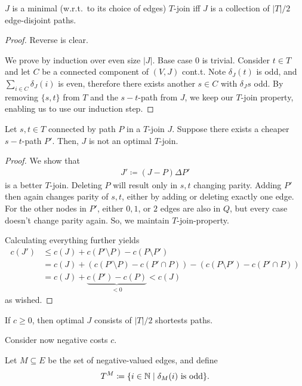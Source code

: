 \begin{theorem}
    $J$ is a minimal (w.r.t.\ to its choice of edges) $T$-join iff $J$ is a collection of $|T|/2$ edge-disjoint paths.
\end{theorem}
\begin{proof}
    Reverse is clear.

    We prove by induction over even size $|J|$. Base case $0$ is trivial.
    Consider $t \in T$ and let $C$ be a connected component of $(V,J)$ cont.t.
    Note $\delta_J(t)$ is odd, and $\sum_{i\in C}\delta_J(i)$ is even, therefore there exists
    another $s \in C$ with $\delta_J{s}$ odd.
    By removing $\{s,t\}$ from $T$ and the $s-t$-path from $J$, we keep our $T$-join property, enabling us to use our induction step.
\end{proof}
\begin{theorem}
    Let $s,t \in T$ connected by path $P$ in a $T$-join $J$. Suppose there exists a cheaper $s-t$-path $P'$.
    Then, $J$ is not an optimal $T$-join.
\end{theorem}
\begin{proof}
    We show that
    \begin{align*}
        J' \coloneqq (J - P) \Delta P'
    \end{align*}
    is a better $T$-join. Deleting $P$ will result only in $s,t$ changing parity.
    Adding $P'$ then again changes parity of $s,t$, either by adding or deleting exactly one edge.
    For the other nodes in $P'$, either $0,1$, or $2$ edges are also in $Q$, but every case doesn't change parity again.
    So, we maintain $T$-join-property.

    Calculating everything further yields
    \begin{align*}
        c(J') & \leq c(J) + c(P' \setminus P) - c(P \setminus P')                                \\
              & = c(J) + (c(P' \setminus P) - c(P' \cap P)) - (c(P \setminus P') - c(P' \cap P)) \\
              & = c(J) + \underbrace{c(P')-c(P)}_{<0}< c(J)
    \end{align*}
    as wished.
\end{proof}
\begin{corollary}
    If $c \geq 0$, then optimal $J$ consists of $|T|/2$ shortests paths.
\end{corollary}
Consider now negative costs $c$.
\begin{definition}
    Let $M \subseteq E$ be the set of negative-valued edges, and define
    \begin{align*}
        T^M \coloneqq  \{i \in \mathbb{N} \mid \delta_M(i) \text{ is odd}\}.
    \end{align*}
\end{definition}
